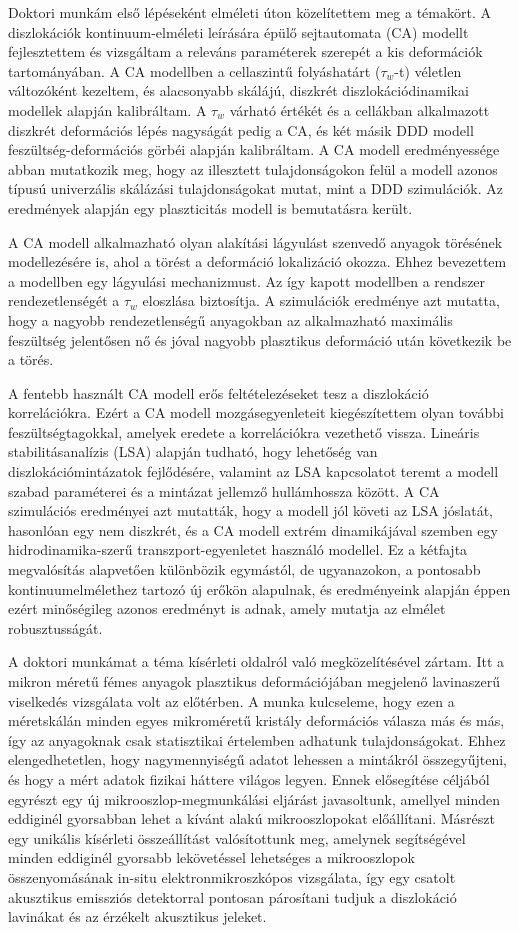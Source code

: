 Doktori munkám első lépéseként elméleti úton közelítettem meg a témakört. A diszlokációk kontinuum-elméleti leírására épülő sejtautomata (CA) modellt fejlesztettem és vizsgáltam a releváns paraméterek szerepét a kis deformációk tartományában. A CA modellben a cellaszintű folyáshatárt ($\tau_w$-t) véletlen változóként kezeltem, és alacsonyabb skálájú, diszkrét diszlokációdinamikai modellek alapján kalibráltam. A $\tau_w$ várható értékét és a cellákban alkalmazott diszkrét deformációs lépés nagyságát pedig a CA, és két másik DDD modell feszültség-deformációs görbéi alapján kalibráltam. A CA modell eredményessége abban mutatkozik meg, hogy az illesztett tulajdonságokon felül a modell azonos típusú univerzális skálázási tulajdonságokat mutat, mint a DDD szimulációk. Az eredmények alapján egy plaszticitás modell is bemutatásra került.

A CA modell alkalmazható olyan alakítási lágyulást szenvedő anyagok törésének modellezésére is, ahol a törést a deformáció lokalizáció okozza. Ehhez bevezettem a modellben egy lágyulási mechanizmust. Az így kapott modellben a rendszer rendezetlenségét a $\tau_w$ eloszlása biztosítja. A szimulációk eredménye azt mutatta, hogy a nagyobb rendezetlenségű anyagokban az alkalmazható maximális feszültség jelentősen nő és jóval nagyobb plasztikus deformáció után következik be a törés.

A fentebb használt CA modell erős feltételezéseket tesz a diszlokáció korrelációkra. Ezért a CA modell mozgásegyenleteit kiegészítettem olyan további feszültségtagokkal, amelyek eredete a korrelációkra vezethető vissza. Lineáris stabilitásanalízis (LSA) alapján tudható, hogy lehetőség van diszlokációmintázatok fejlődésére, valamint az LSA kapcsolatot teremt a modell szabad paraméterei és a mintázat jellemző hullámhossza között. A CA szimulációs eredményei azt mutatták, hogy a modell jól követi az LSA jóslatát, hasonlóan egy nem diszkrét, és a CA modell extrém dinamikájával szemben egy hidrodinamika-szerű transzport-egyenletet használó modellel. Ez a kétfajta megvalósítás alapvetően különbözik egymástól, de ugyanazokon, a pontosabb kontinuumelmélethez tartozó új erőkön alapulnak, és eredményeink alapján éppen ezért minőségileg azonos eredményt is adnak, amely mutatja az elmélet robusztusságát.

A doktori munkámat a téma kísérleti oldalról való megközelítésével zártam. Itt a mikron méretű fémes anyagok plasztikus deformációjában megjelenő lavinaszerű viselkedés vizsgálata volt az előtérben. A munka kulcseleme, hogy ezen a méretskálán minden egyes mikroméretű kristály deformációs válasza más és más, így az anyagoknak csak statisztikai értelemben adhatunk tulajdonságokat. Ehhez elengedhetetlen, hogy nagymennyiségű adatot lehessen a mintákról összegyűjteni, és hogy a mért adatok fizikai háttere világos legyen. Ennek elősegítése céljából egyrészt egy új mikrooszlop-megmunkálási eljárást javasoltunk, amellyel minden eddiginél gyorsabban lehet a kívánt alakú mikrooszlopokat előállítani. Másrészt egy unikális kísérleti összeállítást valósítottunk meg, amelynek segítségével minden eddiginél gyorsabb lekövetéssel lehetséges a mikrooszlopok összenyomásának in-situ elektronmikroszkópos vizsgálata, így egy csatolt akusztikus emissziós detektorral pontosan párosítani tudjuk a diszlokáció lavinákat és az érzékelt akusztikus jeleket.
